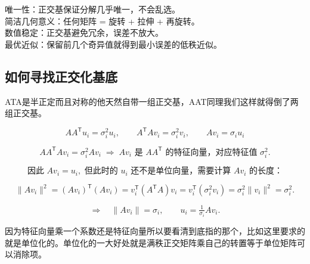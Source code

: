 \begin{dxtips}[正交化的好处]
    

 唯一性：正交基保证分解几乎唯一，不会乱选。
\\ 简洁几何意义：任何矩阵 = 旋转 + 拉伸 + 再旋转。
\\数值稳定：正交基避免冗余，误差不放大。
\\ 最优近似：保留前几个奇异值就得到最小误差的低秩近似。
\end{dxtips}
\subsection{如何寻找正交化基底}
ATA是半正定而且对称的他天然自带一组正交基，AAT同理我们这样就得倒了两组正交基。
\begin{tcolorbox}[colback=blue!5!white, colframe=blue!75!black, title=来自 SVD 的选择]
\[
AA^{\mathsf T} u_i = \sigma_i^2 u_i,
\qquad
A^{\mathsf T} A v_i = \sigma_i^2 v_i,
\qquad
A v_i = \sigma_i u_i
\]
\end{tcolorbox}
\[
AA^{\mathsf T}Av_i=\sigma_i^2 Av_i 
\;\Rightarrow\; 
Av_i \text{ 是 } AA^{\mathsf T} \text{ 的特征向量，对应特征值 } \sigma_i^2.
\]

\[
\text{因此 } Av_i=u_i, \text{ 但此时的 } u_i \text{ 还不是单位向量，需要计算 } Av_i \text{ 的长度：}
\]

\[
\|Av_i\|^2
= (Av_i)^{\mathsf T}(Av_i)
= v_i^{\mathsf T}(A^{\mathsf T}A)v_i
= v_i^{\mathsf T}(\sigma_i^2 v_i)
= \sigma_i^2 \|v_i\|^2
= \sigma_i^2.
\]

\[
\Rightarrow\quad \|Av_i\|=\sigma_i, 
\qquad 
u_i=\tfrac{1}{\sigma_i}Av_i.
\]
\begin{dxtips}
    因为特征向量乘一个系数还是特征向量所以要看清到底指的那个，比如这里要求的就是单位化的。单位化的一大好处就是满秩正交矩阵乘自己的转置等于单位矩阵可以消除项。
\end{dxtips}

